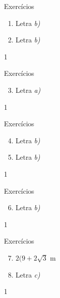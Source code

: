 \begin{answer}{Exercícios}
{\exerciselist
\begin{enumerate}
\item Letra \textit{b)}
\item Letra \textit{b)}
\end{enumerate}
}{1}
\end{answer}
\clearmargin
\begin{answer}{Exercícios}
{\exerciselist
\begin{enumerate}\setcounter{enumi}{2}
\item Letra \textit{a)}
\end{enumerate}
}{1}
\end{answer}
\clearmargin
\begin{answer}{Exercícios}
{\exerciselist
\begin{enumerate}\setcounter{enumi}{3}
\item Letra \textit{b)}
\item Letra \textit{b)}
\end{enumerate}
}{1}
\end{answer}
\clearmargin
\begin{answer}{Exercícios}
{\exerciselist
\begin{enumerate}\setcounter{enumi}{5}
\item Letra \textit{b)}
\end{enumerate}
}{1}
\end{answer}
\clearmargin
\begin{answer}{Exercícios}
{\exerciselist
\begin{enumerate}\setcounter{enumi}{6}
\item $2(9+2\sqrt{3}$ m
\item Letra \textit{c)}
\end{enumerate}
}{1}
\end{answer}
\clearmargin
